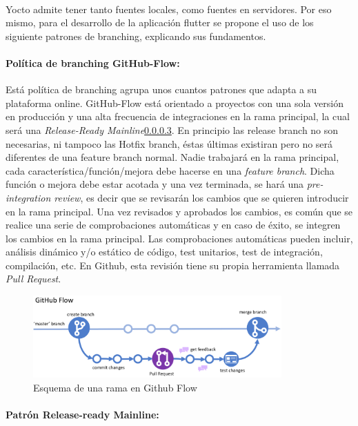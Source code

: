 \paragraph{}Yocto admite tener tanto fuentes locales, como fuentes en servidores. Por
eso mismo, para el desarrollo de la aplicación flutter se propone el uso de los
siguiente patrones de branching, explicando sus fundamentos.

\paragraph{Política de branching GitHub-Flow:} Está política de branching agrupa unos
cuantos patrones que adapta a su plataforma online. GitHub-Flow está orientado a proyectos
con una sola versión en producción y una alta frecuencia de integraciones en la rama
principal, la cual será una \emph{Release-Ready Mainline}\ref{sec:release-ready}. En
principio las release branch no son necesarias, ni tampoco las Hotfix branch, éstas
últimas existiran pero no será diferentes de una feature branch normal. Nadie trabajará
en la rama principal, cada característica/función/mejora debe hacerse en una \emph{feature
branch}. Dicha función o mejora debe estar acotada y una vez terminada, se hará una
\emph{pre-integration review}, es decir que se revisarán los cambios que se quieren
introducir en la rama principal. Una vez revisados y aprobados los cambios, es común
que se realice una serie de comprobaciones automáticas y en caso de éxito, se integren
los cambios en la rama principal. Las comprobaciones automáticas pueden incluir, análisis
dinámico y/o estático de código, test unitarios, test de integración, compilación, etc.
En Github, esta revisión tiene su propia herramienta llamada \emph{Pull Request}.

\begin{figure}[H]
    \centering
    \includegraphics[width=0.85\textwidth]{imgs/github-flow}
    \caption{Esquema de una rama en Github Flow}
    \label{imgs:github-flow}
\end{figure}

\paragraph{Patrón Release-ready Mainline:}\label{sec:release-ready}

